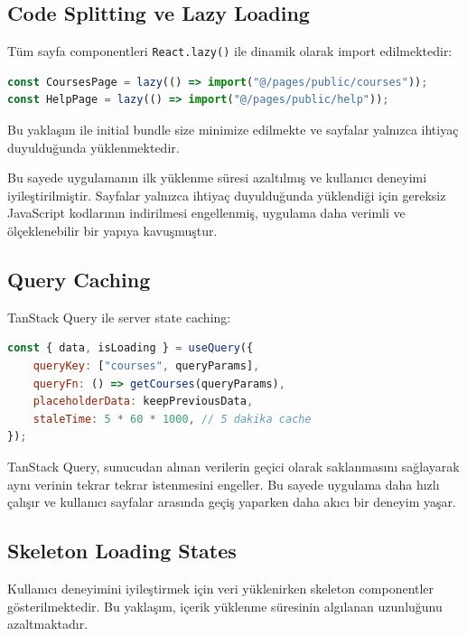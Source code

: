 \documentclass[12pt,a4paper]{article}
\begin{document}
\subsection{Code Splitting ve Lazy Loading}

Tüm sayfa componentleri \texttt{React.lazy()} ile dinamik olarak import edilmektedir:

\begin{lstlisting}[language=JavaScript, basicstyle=\ttfamily\small]
const CoursesPage = lazy(() => import("@/pages/public/courses"));
const HelpPage = lazy(() => import("@/pages/public/help"));
\end{lstlisting}

Bu yaklaşım ile initial bundle size minimize edilmekte ve sayfalar yalnızca ihtiyaç duyulduğunda yüklenmektedir. 

Bu sayede uygulamanın ilk yüklenme süresi azaltılmış ve kullanıcı deneyimi iyileştirilmiştir. Sayfalar yalnızca ihtiyaç duyulduğunda yüklendiği için gereksiz JavaScript kodlarının indirilmesi engellenmiş, uygulama daha verimli ve ölçeklenebilir bir yapıya kavuşmuştur.

\subsection{Query Caching}

TanStack Query ile server state caching:

\begin{lstlisting}[language=JavaScript, basicstyle=\ttfamily\small]
const { data, isLoading } = useQuery({
    queryKey: ["courses", queryParams],
    queryFn: () => getCourses(queryParams),
    placeholderData: keepPreviousData,
    staleTime: 5 * 60 * 1000, // 5 dakika cache
});
\end{lstlisting}

TanStack Query, sunucudan alınan verilerin geçici olarak saklanmasını sağlayarak aynı verinin tekrar tekrar istenmesini engeller. Bu sayede uygulama daha hızlı çalışır ve kullanıcı sayfalar arasında geçiş yaparken daha akıcı bir deneyim yaşar.

\subsection{Skeleton Loading States}

Kullanıcı deneyimini iyileştirmek için veri yüklenirken skeleton componentler gösterilmektedir. Bu yaklaşım, içerik yüklenme süresinin algılanan uzunluğunu azaltmaktadır.
\end{document}
